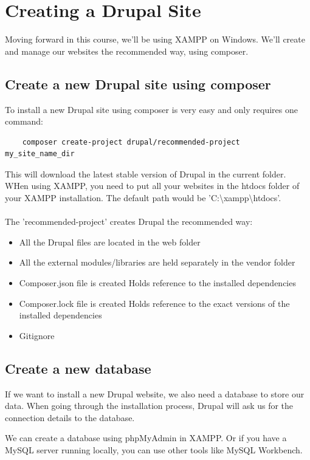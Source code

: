 \chapter{Creating a Drupal Site}
\label{ch:creating_a_drupal_site}

Moving forward in this course, we'll be using XAMPP on Windows. We'll create and manage our websites the recommended way, using composer.

\section{Create a new Drupal site using composer}
To install a new Drupal site using composer is very easy and only requires one command:

\begin{verbatim}
    composer create-project drupal/recommended-project my_site_name_dir
\end{verbatim}

This will download the latest stable version of Drupal in the current folder. WHen using XAMPP, you need to put all your websites in the htdocs folder of your XAMPP installation. The default path would be 'C:\textbackslash xampp\textbackslash htdocs'.
\\\\
The 'recommended-project' creates Drupal the recommended way:
\begin{itemize}
    \item All the Drupal files are located in the web folder
    \item All the external modules/libraries are held separately in the vendor folder
    \item Composer.json file is created
    \subitem Holds reference to the installed dependencies
    \item	Composer.lock file is created
    \subitem Holds reference to the exact versions of the installed dependencies
   \item Gitignore 
\end{itemize}

\section{Create a new database}
If we want to install a new Drupal website, we also need a database to store our data. When going through the installation process, Drupal will ask us for the connection details to the database.

We can create a database using phpMyAdmin in XAMPP. Or if you have a MySQL server running locally, you can use other tools like MySQL Workbench.

